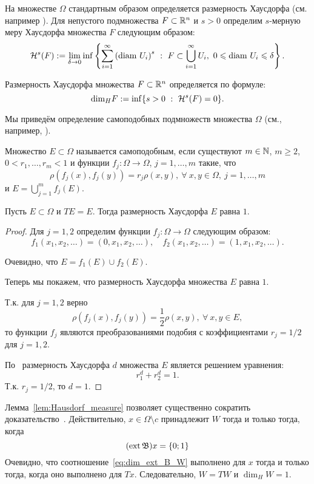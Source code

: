 На множестве $\Omega$ стандартным образом определяется размерность Хаусдорфа (см. например \cite[Секция 6]{Edgar}).
Для непустого подмножества $F\subset \mathbb{R}^n$ и $s > 0$ определим $s$-мерную меру Хаусдорфа множества $F$ следующим образом:
$$\mathcal H^s(F) := \lim_{\delta\to0} \inf \left\{\sum_{i=1}^\infty \left({\rm diam} \ U_i \right)^s \ : \ F\subset \bigcup_{i=1}^\infty  U_i, \  0\leqslant {\rm diam} \ U_i \leqslant \delta \right\}.$$

Размерность Хаусдорфа множества  $F\subset \mathbb{R}^n$ определяется по формуле:
$${\rm dim}_H F := \inf\{ s > 0 \ : \ \mathcal H^s(F)=0\}.$$



Мы приведём определение самоподобных подмножеств множества $\Omega$ (см., например, \cite{falconer2003fractal}).

\begin{definition}
Множество $E\subset\Omega$ называется самоподобным, если существуют $m\in\mathbb{N}$,
$m\geqslant2$, $0< r_1, \dots, r_m<1$ и функции $f_j : \Omega \to \Omega$, $j=1,\dots, m$ такие, что
$$\rho(f_j(x), f_j(y)) = r_j \rho(x,y), \ \forall \ x,y \in \Omega, \ j=1,\dots, m$$
и $E=\bigcup_{j=1}^m f_j(E).$
\end{definition}



\begin{lemma}
	\label{lem:Hausdorf_measure}
	Пусть $E\subset\Omega$ и $TE = E$.
	Тогда размерность Хаусдорфа $E$ равна $1$.
\end{lemma}

\begin{proof}
	Для $j=1,2$ определим функции $f_j : \Omega \to \Omega$ следующим образом:
	$$f_1(x_1, x_2, \dots)=(0, x_1, x_2, \dots), \quad f_2(x_1, x_2, \dots)=(1, x_1, x_2, \dots).$$

	Очевидно, что $E=f_1(E)\cup f_2(E).$

	Теперь мы покажем, что размерность Хаусдорфа множества $E$ равна $1$.

	Т.к. для $j=1,2$ верно
	 $$\rho(f_j(x),f_j(y))=\frac12\rho(x,y), \ \forall \ x, y \in E,$$
	 то функции $f_j$ являются преобразованиями подобия с коэффициентами $r_j=1/2$ для $j=1,2$.


	По~\cite[Теорема 9.3]{Edgar} размерность Хаусдорфа $d$ множества $E$ является решением уравнения:
	$$ r_1^d+r_2^d=1.$$
	Т.к. $r_j=1/2$, то
	$d=1.$
\end{proof}

Лемма~\ref{lem:Hausdorf_measure} позволяет существенно сократить доказательство~\cite[утверждение 12]{avdeed2021AandA}.
Действительно, $x\in\Omega\setminus c$ принадлежит $W$ тогда и только тогда, когда
\begin{equation}
	\label{eq:dim_ext_B_W}
	(\ext \mathfrak{B})x = \{0;1\}
\end{equation}
Очевидно, что соотношение~\eqref{eq:dim_ext_B_W} выполнено для $x$ тогда и только тогда, когда оно выполнено для $Tx$.
Следовательно, $W=TW$ и $\dim_H W = 1$.

